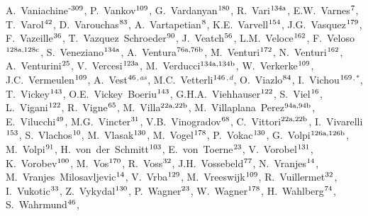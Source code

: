 \begin{flushleft}
A.~Vaniachine$^\textrm{\scriptsize -309}$,
P.~Vankov$^\textrm{\scriptsize 109}$,
G.~Vardanyan$^\textrm{\scriptsize 180}$,
R.~Vari$^\textrm{\scriptsize 134a}$,
E.W.~Varnes$^\textrm{\scriptsize 7}$,
T.~Varol$^\textrm{\scriptsize 42}$,
D.~Varouchas$^\textrm{\scriptsize 83}$,
A.~Vartapetian$^\textrm{\scriptsize 8}$,
K.E.~Varvell$^\textrm{\scriptsize 154}$,
J.G.~Vasquez$^\textrm{\scriptsize 179}$,
F.~Vazeille$^\textrm{\scriptsize 36}$,
T.~Vazquez~Schroeder$^\textrm{\scriptsize 90}$,
J.~Veatch$^\textrm{\scriptsize 56}$,
L.M.~Veloce$^\textrm{\scriptsize 162}$,
F.~Veloso$^\textrm{\scriptsize 128a,128c}$,
S.~Veneziano$^\textrm{\scriptsize 134a}$,
A.~Ventura$^\textrm{\scriptsize 76a,76b}$,
M.~Venturi$^\textrm{\scriptsize 172}$,
N.~Venturi$^\textrm{\scriptsize 162}$,
A.~Venturini$^\textrm{\scriptsize 25}$,
V.~Vercesi$^\textrm{\scriptsize 123a}$,
M.~Verducci$^\textrm{\scriptsize 134a,134b}$,
W.~Verkerke$^\textrm{\scriptsize 109}$,
J.C.~Vermeulen$^\textrm{\scriptsize 109}$,
A.~Vest$^\textrm{\scriptsize 46}$$^{,as}$,
M.C.~Vetterli$^\textrm{\scriptsize 146}$$^{,d}$,
O.~Viazlo$^\textrm{\scriptsize 84}$,
I.~Vichou$^\textrm{\scriptsize 169}$$^{,*}$,
T.~Vickey$^\textrm{\scriptsize 143}$,
O.E.~Vickey~Boeriu$^\textrm{\scriptsize 143}$,
G.H.A.~Viehhauser$^\textrm{\scriptsize 122}$,
S.~Viel$^\textrm{\scriptsize 16}$,
L.~Vigani$^\textrm{\scriptsize 122}$,
R.~Vigne$^\textrm{\scriptsize 65}$,
M.~Villa$^\textrm{\scriptsize 22a,22b}$,
M.~Villaplana~Perez$^\textrm{\scriptsize 94a,94b}$,
E.~Vilucchi$^\textrm{\scriptsize 49}$,
M.G.~Vincter$^\textrm{\scriptsize 31}$,
V.B.~Vinogradov$^\textrm{\scriptsize 68}$,
C.~Vittori$^\textrm{\scriptsize 22a,22b}$,
I.~Vivarelli$^\textrm{\scriptsize 153}$,
S.~Vlachos$^\textrm{\scriptsize 10}$,
M.~Vlasak$^\textrm{\scriptsize 130}$,
M.~Vogel$^\textrm{\scriptsize 178}$,
P.~Vokac$^\textrm{\scriptsize 130}$,
G.~Volpi$^\textrm{\scriptsize 126a,126b}$,
M.~Volpi$^\textrm{\scriptsize 91}$,
H.~von~der~Schmitt$^\textrm{\scriptsize 103}$,
E.~von~Toerne$^\textrm{\scriptsize 23}$,
V.~Vorobel$^\textrm{\scriptsize 131}$,
K.~Vorobev$^\textrm{\scriptsize 100}$,
M.~Vos$^\textrm{\scriptsize 170}$,
R.~Voss$^\textrm{\scriptsize 32}$,
J.H.~Vossebeld$^\textrm{\scriptsize 77}$,
N.~Vranjes$^\textrm{\scriptsize 14}$,
M.~Vranjes~Milosavljevic$^\textrm{\scriptsize 14}$,
V.~Vrba$^\textrm{\scriptsize 129}$,
M.~Vreeswijk$^\textrm{\scriptsize 109}$,
R.~Vuillermet$^\textrm{\scriptsize 32}$,
I.~Vukotic$^\textrm{\scriptsize 33}$,
Z.~Vykydal$^\textrm{\scriptsize 130}$,
P.~Wagner$^\textrm{\scriptsize 23}$,
W.~Wagner$^\textrm{\scriptsize 178}$,
H.~Wahlberg$^\textrm{\scriptsize 74}$,
S.~Wahrmund$^\textrm{\scriptsize 46}$,
$$
\end{flushleft}
